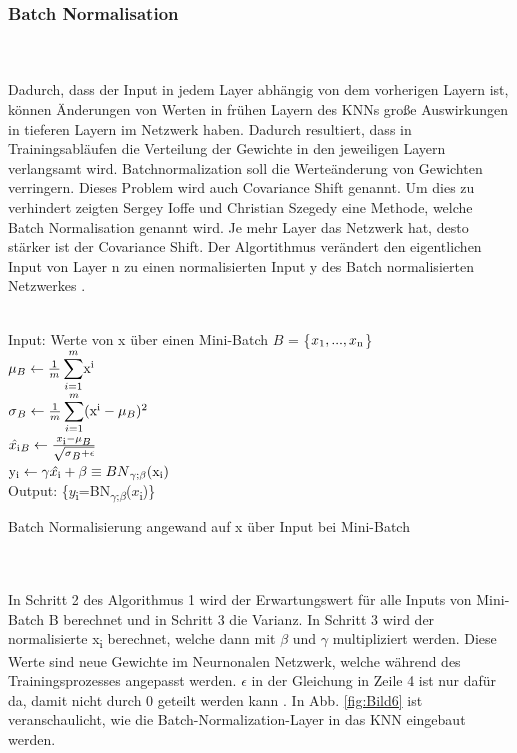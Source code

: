 \documentclass{llncs}
\begin{document}
\subsubsection{Batch Normalisation}
~\\\\
Dadurch, dass der Input in jedem Layer abhängig von dem vorherigen Layern ist, können Änderungen von Werten in frühen Layern des KNNs große Auswirkungen in tieferen Layern im Netzwerk haben. Dadurch resultiert, dass in Trainingsabläufen die Verteilung der Gewichte in den jeweiligen Layern verlangsamt wird. Batchnormalization soll die Werteänderung von Gewichten verringern. Dieses Problem wird auch Covariance Shift genannt. Um dies zu verhindert zeigten Sergey Ioffe und Christian Szegedy \cite{batchnorm} eine Methode, welche Batch Normalisation genannt wird. Je mehr Layer das Netzwerk hat, desto stärker ist der Covariance Shift. Der Algortithmus verändert den eigentlichen Input von Layer n zu einen normalisierten Input y des Batch normalisierten Netzwerkes \cite{batchnorm}.
\\\\
\begin{algorithm}[H]
	Input: Werte von x über einen Mini-Batch $B$ = \{$x\textsubscript{1},...,x\textsubscript{n}$\}\\
	\begin{math}
	\mu\textsubscript{$B$}\leftarrow\frac{1}{m}\displaystyle\sum_{i=1}^{m}$x$\textsuperscript{i}
	\end{math}\\
	\begin{math}
	\sigma\textsubscript{$B$}\leftarrow\frac{1}{m}\displaystyle\sum_{i=1}^{m}($x$\textsuperscript{i} - \mu\textsubscript{$B$})\textsuperscript{2}
	\end{math}\\
	\begin{math}
	\hat{x\textsubscript{i}}\textsubscript{$B$}\leftarrow\frac{x\textsubscript{i}-\mu\textsubscript{$B$}}{\sqrt{\sigma\textsubscript{$B$} + \epsilon}}
	\end{math}\\
	\begin{math}
	$y$\textsubscript{i}\leftarrow\gamma\hat{x\textsubscript{i}} + \beta \equiv BN\textsubscript{$\gamma$;$\beta$}($x$\textsubscript{i})
	\end{math}\\
	Output: \{$y$\textsubscript{i}=BN\textsubscript{$\gamma$;$\beta$}($x$\textsubscript{i})\}
	\caption{Batch Normalisierung angewand auf x über Input bei Mini-Batch  }	
\end{algorithm}
~\\\\
In Schritt 2 des Algorithmus 1 wird der Erwartungswert für alle Inputs von Mini-Batch B berechnet und in Schritt 3 die Varianz. In Schritt 3 wird der normalisierte x\textsubscript{i} berechnet, welche dann mit $\beta$ und $\gamma$ multipliziert werden. Diese Werte sind neue Gewichte im Neurnonalen Netzwerk, welche während des Trainingsprozesses angepasst werden. $\epsilon$ in der Gleichung in Zeile 4 ist nur dafür da, damit nicht durch 0 geteilt werden kann \cite{batchnorm}. In Abb. \ref{fig:Bild6} ist veranschaulicht, wie die Batch-Normalization-Layer in das KNN eingebaut werden. 
\end{document}
